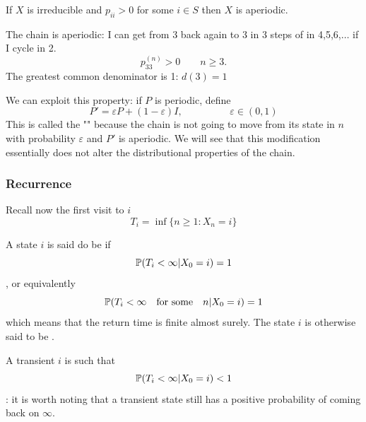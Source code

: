 \documentclass{article}
\begin{document}
\begin{proposition}
    If $X$ is irreducible and $p_{ii}>0$ for some $i \in S$ then $X$ is aperiodic.
\end{proposition}
\begin{example}
     \begin{minipage}{0.5\textwidth}
        \begin{figure}[H]
            \centering
        \end{figure}
    \end{minipage} \hfill
    \begin{minipage}{0.45\textwidth}
        The chain is aperiodic: I can get from 3 back again to 3 in 3 steps of in 4,5,6,$\ldots$ if I cycle in 2.
        \[p_{33}^{(n)}>0\qquad n\geqslant 3.\]
        The greatest common denominator is 1: $d(3)=1$
    \end{minipage}
\end{example}
We can exploit this property: if $P$ is periodic, define
\[
P'=\varepsilon P+(1-\varepsilon)I,\hspace{2cm} \varepsilon\in(0,1)
\]
This is called the "" because the chain is not going to move from its state in $n$ with probability $\varepsilon$ and $P'$ is aperiodic. We will see that this modification essentially does not alter the distributional properties of the chain. 
\subsubsection{Recurrence}
Recall now the first visit to $i$
\[
T_i=\inf\{n\geqslant 1: X_n=i\}
\]

\begin{definition}
    A state $i$ is said do be  if \[\mathbb{P}(T_i<\infty|X_0=i)=1\],  or equivalently \[\mathbb{P}(T_i<\infty \quad\text{for some}\quad n|X_0=i)=1\] which means that the return time is finite almost surely. The state $i$ is otherwise said to be .
\end{definition}
A transient $i$ is such that \[\mathbb{P}(T_i<\infty|X_0=i)<1\]: it is worth noting that a transient state still has a positive probability of coming back on $\infty$.
\end{document}
